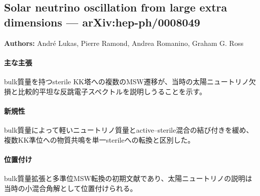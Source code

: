 \subsection{Solar neutrino oscillation from large extra dimensions --- arXiv:hep-ph/0008049}

\textbf{Authors:} Andr\'e Lukas, Pierre Ramond, Andrea Romanino, Graham G. Ross

\paragraph{主な主張}
bulk質量を持つsterile KK塔への複数のMSW遷移が、当時の太陽ニュートリノ欠損と比較的平坦な反跳電子スペクトルを説明しうることを示す\cite{Lukas:2000SolarBulk}。

\paragraph{新規性}
bulk質量によって軽いニュートリノ質量とactive--sterile混合の結び付きを緩め、複数KK準位への物質共鳴を単一sterileへの転換と区別した。

\paragraph{位置付け}
bulk質量拡張と多準位MSW転換の初期文献であり、太陽ニュートリノの説明は当時の小混合角解として位置付けられる。
